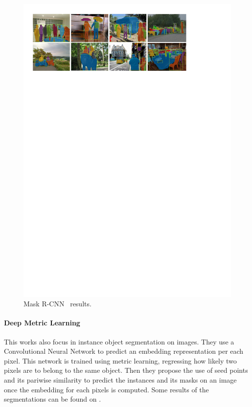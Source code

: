 \begin{figure}[h]
  \centering
  \includegraphics[width=1.\linewidth]{figures/maskrcnn/results.pdf}
  \caption{Mask R-CNN~\cite{he2017mask} results. }
  \label{fig:maskrcnn}
\end{figure}

\paragraph{Deep Metric Learning~\deepml}
This works also focus in instance object segmentation on images.
They use a Convolutional Neural Network to predict an embedding representation per each pixel.
This network is trained using metric learning, regressing how likely two pixels are to belong to the same object.
Then they propose the use of seed points and its pariwise similarity to predict the instances and its masks on an image once the embedding for each pixels is computed.
Some results of the segmentations can be found on .

